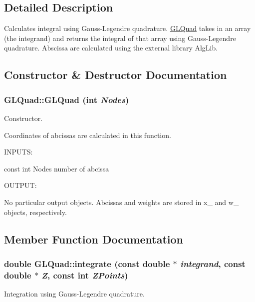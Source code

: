 \subsection{Detailed Description}
Calculates integral using Gauss-\/Legendre quadrature. \hyperlink{classGLQuad}{GLQuad} takes in an array (the integrand) and returns the integral of that array using Gauss-\/Legendre quadrature. Abscissa are calculated using the external library AlgLib. 

\subsection{Constructor \& Destructor Documentation}
\hypertarget{classGLQuad_a835d29af2507b6b2716794d3371d2ba8}{
\subsubsection[{GLQuad}]{\setlength{\rightskip}{0pt plus 5cm}GLQuad::GLQuad (int {\em Nodes})}}
\label{db/d06/classGLQuad_a835d29af2507b6b2716794d3371d2ba8}


Constructor. 

Coordinates of abcissas are calculated in this function.

INPUTS:

const int Nodes number of abcissa

OUTPUT:

No particular output objects. Abcissas and weights are stored in x\_\- and w\_\- objects, respectively. 

\subsection{Member Function Documentation}
\hypertarget{classGLQuad_a951e36d849cfadc749a62218212802b6}{
\subsubsection[{integrate}]{\setlength{\rightskip}{0pt plus 5cm}double GLQuad::integrate (const double $\ast$ {\em integrand}, \/  const double $\ast$ {\em Z}, \/  const int {\em ZPoints})}}
\label{db/d06/classGLQuad_a951e36d849cfadc749a62218212802b6}


Integration using Gauss-\/Legendre quadrature. 

